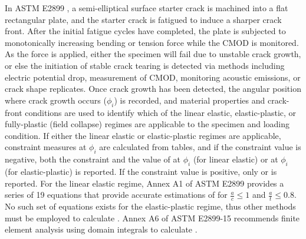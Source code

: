 In ASTM E2899 \cite{astme2899}, a semi-elliptical surface starter crack is machined into a flat rectangular plate, and the starter crack is fatigued to induce a sharper crack front.
After the initial fatigue cycles have completed, the plate is subjected to monotonically increasing bending or tension force while the CMOD is monitored.
As the force is applied, either the specimen will fail due to unstable crack growth, or else the initiation of stable crack tearing is detected via methods including electric potential drop, measurement of CMOD, monitoring acoustic emissions, or crack shape replicates.
Once crack growth has been detected, the angular position where crack growth occurs (\(\phi_i\)) is recorded, and material properties and crack-front conditions are used to identify which of the linear elastic, elastic-plastic, or fully-plastic (field collapse) regimes are applicable to the specimen and loading condition.
If either the linear elastic or elastic-plastic regimes are applicable, constraint measures at \(\phi_i\) are calculated from tables, and if the constraint value is negative, both the constraint and the value of \K at \(\phi_i\) (for linear elastic) or \J at \(\phi_i\) (for elastic-plastic) is reported.
If the constraint value is positive, only \K or \J is reported.
For the linear elastic regime, Annex A1 of ASTM E2899 provides a series of 19 equations that provide accurate estimations of \KI for \(\frac{a}{c} \leq 1\) and \(\frac{a}{t} \leq 0.8\).
No such set of equations exists for the elastic-plastic regime, thus other methods must be employed to calculate \J.
Annex A6 of ASTM E2899-15 recommends finite element analysis using domain integrals to calculate \J.

